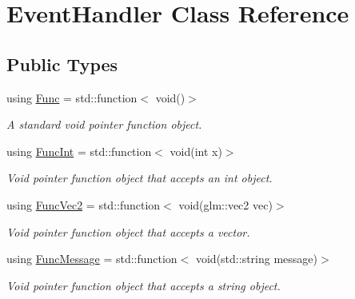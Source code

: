 \hypertarget{class_event_handler}{}\section{Event\+Handler Class Reference}
\label{class_event_handler}
\subsection*{Public Types}
\begin{DoxyCompactItemize}
\item 
\mbox{\label{class_event_handler_af1c003b45c76eb6eb0852801a997561b}} 
using \mbox{\hyperlink{class_event_handler_af1c003b45c76eb6eb0852801a997561b}{Func}} = std\+::function$<$ void()$>$
\begin{DoxyCompactList}\small\item\em A standard void pointer function object. \end{DoxyCompactList}\item 
\mbox{\label{class_event_handler_afc053859d1bdb89bd10f01ff22c99fed}} 
using \mbox{\hyperlink{class_event_handler_afc053859d1bdb89bd10f01ff22c99fed}{Func\+Int}} = std\+::function$<$ void(int x)$>$
\begin{DoxyCompactList}\small\item\em Void pointer function object that accepts an int object. \end{DoxyCompactList}\item 
\mbox{\label{class_event_handler_a814f37c7df5b2bf170d82904b3e525d6}} 
using \mbox{\hyperlink{class_event_handler_a814f37c7df5b2bf170d82904b3e525d6}{Func\+Vec2}} = std\+::function$<$ void(glm\+::vec2 vec)$>$
\begin{DoxyCompactList}\small\item\em Void pointer function object that accepts a vector. \end{DoxyCompactList}\item 
\mbox{\label{class_event_handler_a21c76d0c722afe4925c87aa3544e2ce6}} 
using \mbox{\hyperlink{class_event_handler_a21c76d0c722afe4925c87aa3544e2ce6}{Func\+Message}} = std\+::function$<$ void(std\+::string message)$>$
\begin{DoxyCompactList}\small\item\em Void pointer function object that accepts a string object. \end{DoxyCompactList}\end{DoxyCompactItemize}
